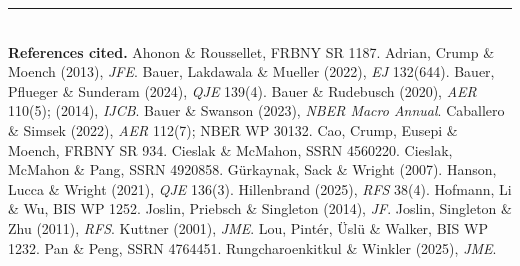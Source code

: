 \documentclass[11pt]{article}
\begin{document}
\vspace{0.8em}
\noindent\rule{\textwidth}{0.4pt}\\[0.3em]
\footnotesize\textbf{References cited.} Ahonon \& Roussellet, FRBNY SR 1187. Adrian, Crump \&
Moench (2013), \emph{JFE}. Bauer, Lakdawala \& Mueller (2022), \emph{EJ} 132(644). Bauer,
Pflueger \& Sunderam (2024), \emph{QJE} 139(4). Bauer \& Rudebusch (2020), \emph{AER} 110(5);
(2014), \emph{IJCB}. Bauer \& Swanson (2023), \emph{NBER Macro Annual}. Caballero \& Simsek
(2022), \emph{AER} 112(7); NBER WP 30132. Cao, Crump, Eusepi \& Moench, FRBNY SR 934. Cieslak
\& McMahon, SSRN 4560220. Cieslak, McMahon \& Pang, SSRN 4920858. Gürkaynak, Sack \& Wright
(2007). Hanson, Lucca \& Wright (2021), \emph{QJE} 136(3). Hillenbrand (2025), \emph{RFS}
38(4). Hofmann, Li \& Wu, BIS WP 1252. Joslin, Priebsch \& Singleton (2014), \emph{JF}. Joslin,
Singleton \& Zhu (2011), \emph{RFS}. Kuttner (2001), \emph{JME}. Lou, Pintér, Üslü \& Walker,
BIS WP 1232. Pan \& Peng, SSRN 4764451. Rungcharoenkitkul \& Winkler (2025), \emph{JME}.
\end{document}
